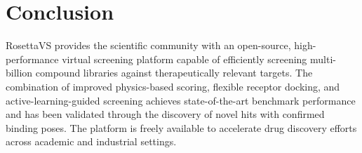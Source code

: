 \documentclass[12pt]{article}
\begin{document}
\section{Conclusion}

RosettaVS provides the scientific community with an open-source, high-performance virtual screening platform capable of efficiently screening multi-billion compound libraries against therapeutically relevant targets. The combination of improved physics-based scoring, flexible receptor docking, and active-learning-guided screening achieves state-of-the-art benchmark performance and has been validated through the discovery of novel hits with confirmed binding poses. The platform is freely available to accelerate drug discovery efforts across academic and industrial settings.



\end{document}
